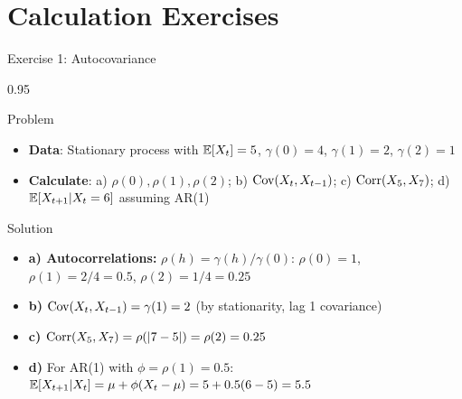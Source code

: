 \documentclass[9pt, aspectratio=169, t]{beamer}
\begin{document}
\section{Calculation Exercises}

\begin{frame}{Exercise 1: Autocovariance}
    \begin{cminipage}{0.95\textwidth}
    \begin{alertblock}{Problem}
        \begin{itemize}\setlength{\itemsep}{0pt}
            \item \textbf{Data}: Stationary process with $\mathbb{E}[X_t] = 5$, $\gamma(0) = 4$, $\gamma(1) = 2$, $\gamma(2) = 1$
            \item \textbf{Calculate}: a) $\rho(0), \rho(1), \rho(2)$; b) $\text{Cov}(X_t, X_{t-1})$; c) $\text{Corr}(X_5, X_7)$; d) $\mathbb{E}[X_{t+1} | X_t = 6]$ assuming AR(1)
        \end{itemize}
    \end{alertblock}

    \vspace{0.2cm}
    \begin{exampleblock}{Solution}
        \begin{itemize}\setlength{\itemsep}{0pt}
            \item \textbf{a) Autocorrelations:} $\rho(h) = \gamma(h)/\gamma(0)$: $\rho(0) = 1$, \quad $\rho(1) = 2/4 = 0.5$, \quad $\rho(2) = 1/4 = 0.25$
            \item \textbf{b)} $\text{Cov}(X_t, X_{t-1}) = \gamma(1) = 2$ \quad (by stationarity, lag 1 covariance)
            \item \textbf{c)} $\text{Corr}(X_5, X_7) = \rho(|7-5|) = \rho(2) = 0.25$
            \item \textbf{d)} For AR(1) with $\phi = \rho(1) = 0.5$:
            $\mathbb{E}[X_{t+1} | X_t] = \mu + \phi(X_t - \mu) = 5 + 0.5(6-5) = 5.5$
        \end{itemize}
    \end{exampleblock}
    \end{cminipage}
\end{frame}
\end{document}
